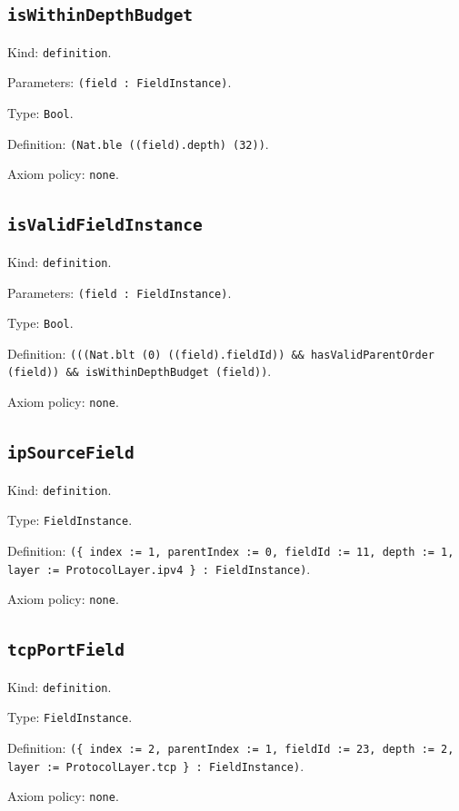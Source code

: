 \documentclass[11pt]{article}
\begin{document}
\subsection*{\texttt{isWithinDepthBudget}}
\noindent Kind: \texttt{definition}.\par
\noindent Parameters: \texttt{(field : FieldInstance)}.\par
\noindent Type: \texttt{Bool}.\par
\noindent Definition: \texttt{(Nat.ble ((field).depth) (32))}.\par
\noindent Axiom policy: \texttt{none}.\par
\subsection*{\texttt{isValidFieldInstance}}
\noindent Kind: \texttt{definition}.\par
\noindent Parameters: \texttt{(field : FieldInstance)}.\par
\noindent Type: \texttt{Bool}.\par
\noindent Definition: \texttt{(((Nat.blt (0) ((field).fieldId)) \&\& hasValidParentOrder (field)) \&\& isWithinDepthBudget (field))}.\par
\noindent Axiom policy: \texttt{none}.\par
\subsection*{\texttt{ipSourceField}}
\noindent Kind: \texttt{definition}.\par
\noindent Type: \texttt{FieldInstance}.\par
\noindent Definition: \texttt{(\{ index := 1, parentIndex := 0, fieldId := 11, depth := 1, layer := ProtocolLayer.ipv4 \} : FieldInstance)}.\par
\noindent Axiom policy: \texttt{none}.\par
\subsection*{\texttt{tcpPortField}}
\noindent Kind: \texttt{definition}.\par
\noindent Type: \texttt{FieldInstance}.\par
\noindent Definition: \texttt{(\{ index := 2, parentIndex := 1, fieldId := 23, depth := 2, layer := ProtocolLayer.tcp \} : FieldInstance)}.\par
\noindent Axiom policy: \texttt{none}.\par
\end{document}
